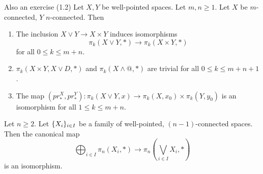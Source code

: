 \documentclass[language=english]{TemplateLecture}
\begin{document}
\begin{proposition}
    Also an exercise (1.2) Let \(X,Y\) be well-pointed spaces. Let \(m,n \geq 1\). Let \(X\) be \(m\)-connected, \(Y\) \(n\)-connected. Then
    \begin{enumerate}
        \item The inclusion \(X\vee Y\to X\times Y\) induces isomorphisms
        \[\pi_k(X\vee Y, *) \to \pi_k(X\times Y, *)\]
        for all \(0 \leq k \leq m+n\).
        \item \(\pi_k(X\times Y, X\vee D, *)\) and \(\pi_k(X\wedge @, *)\) are trivial for all \(0 \leq k\leq m+n+1\).
        \item The map \((pr_*^X, pr_*^Y)\colon \pi_k(X\vee Y, x) \to \pi_k(X, x_0)\times \pi_k(Y, y_0)\) is an isomorphism for all \(1 \leq k \leq m+n\).
    \end{enumerate}
\end{proposition}


\begin{proposition}
    Let \(n \geq 2\). Let \(\{X_i\}_{i\in I}\) be a family of well-pointed, \((n-1)\)-connected spaces. Then the canonical map
    \[\bigoplus_{i\in I} \pi_n(X_i, *) \to \pi_n(\bigvee_{i\in I} X_i, *)\]
    is an isomorphism.
\end{proposition}
\end{document}
